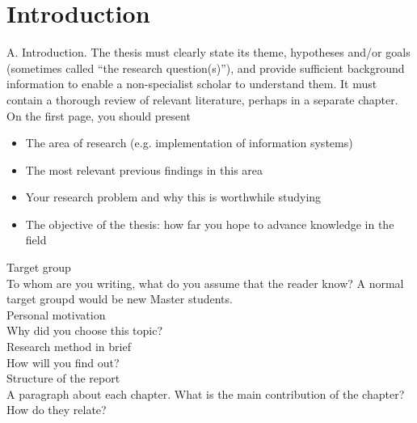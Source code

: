 \chapter{Introduction}
  A. Introduction. The thesis must clearly state its theme, hypotheses and/or goals (sometimes 
    called “the research question(s)”), and provide sufficient background information to enable a 
    non-specialist scholar to understand them. It must contain a thorough review of relevant 
    literature, perhaps in a separate chapter. \\

  On the first page, you should present
  \begin{itemize}
    \item The area of research (e.g. implementation of information systems)
    \item The most relevant previous findings in this area
    \item Your research problem and why this is worthwhile studying
    \item The objective of the thesis: how far you hope to advance knowledge in the field
  \end{itemize}
  Target group \\
  To whom are you writing, what do you assume that the reader know? A normal target groupd would be 
    new Master students. \\
  Personal motivation \\
  Why did you choose this topic? \\
  Research method in brief \\
  How will you find out? \\
  Structure of the report \\
  A paragraph about each chapter. What is the main contribution of the chapter? How do they relate? \\

